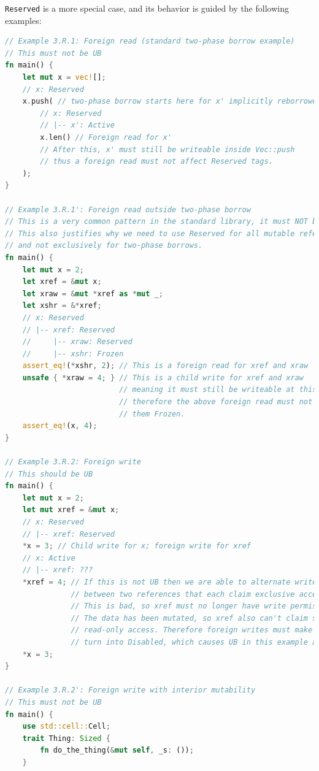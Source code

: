 \documentclass[a4paper,11pt]{article}
\theoremstyle{plain}
\theoremstyle{definition}
\theoremstyle{remark}
\newcommand{\tperm}[1]{\texttt{#1}}
\begin{document}
\tperm{Reserved} is a more special case, and its behavior is guided by the following examples:
\begin{lstlisting}[language=rust]
// Example 3.R.1: Foreign read (standard two-phase borrow example)
// This must not be UB
fn main() {
    let mut x = vec![];
    // x: Reserved
    x.push( // two-phase borrow starts here for x' implicitly reborrowed from x
        // x: Reserved
        // |-- x': Active
        x.len() // Foreign read for x'
        // After this, x' must still be writeable inside Vec::push
        // thus a foreign read must not affect Reserved tags.
    );
}

// Example 3.R.1': Foreign read outside two-phase borrow
// This is a very common pattern in the standard library, it must NOT be UB.
// This also justifies why we need to use Reserved for all mutable references,
// and not exclusively for two-phase borrows.
fn main() {
    let mut x = 2;
    let xref = &mut x;
    let xraw = &mut *xref as *mut _;
    let xshr = &*xref;
    // x: Reserved
    // |-- xref: Reserved
    //     |-- xraw: Reserved
    //     |-- xshr: Frozen
    assert_eq!(*xshr, 2); // This is a foreign read for xref and xraw
    unsafe { *xraw = 4; } // This is a child write for xref and xraw
                          // meaning it must still be writeable at this point,
                          // therefore the above foreign read must not have turned
                          // them Frozen.
    assert_eq!(x, 4);
}

// Example 3.R.2: Foreign write
// This should be UB
fn main() {
    let mut x = 2;
    let mut xref = &mut x;
    // x: Reserved
    // |-- xref: Reserved
    *x = 3; // Child write for x; foreign write for xref
    // x: Active
    // |-- xref: ???
    *xref = 4; // If this is not UB then we are able to alternate writes
               // between two references that each claim exclusive access.
               // This is bad, so xref must no longer have write permissions.
               // The data has been mutated, so xref also can't claim shared
               // read-only access. Therefore foreign writes must make Reserved
               // turn into Disabled, which causes UB in this example as desired.
    *x = 3;
}

// Example 3.R.2': Foreign write with interior mutability
// This must not be UB
fn main() {
    use std::cell::Cell;
    trait Thing: Sized {
        fn do_the_thing(&mut self, _s: ());
    }


\end{lstlisting}
\end{document}
